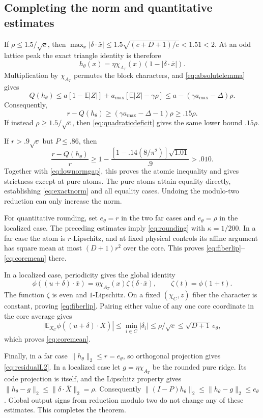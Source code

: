 \documentclass[11pt]{article}
\newcommand{\E}{\mathbb E}
\begin{document}
\subsection{Completing the norm and quantitative estimates}

If $\rho\le1.5/\sqrt c$, then
$\max_x|\delta\cdot\bar x|\le1.5\sqrt{(c+D+1)/c}<1.51<2$.
At an odd lattice peak the exact triangle identity is therefore
\[
 h_\theta(x)=\eta\chi_{A_T}(x)(1-|\delta\cdot\bar x|).
\]
Multiplication by $\chi_{A_T}$ permutes the block characters, and
\eqref{eq:absolutelemma} gives
\[
 Q(h_\theta)\le a[1-\E|Z|]+a_{\max}[\E|Z|-\gamma\rho]
    \le a-(\gamma a_{\max}-\Delta)\rho.
\]
Consequently,
\begin{equation}\label{eq:smallrho}
 r-Q(h_\theta)\ge(\gamma a_{\max}-\Delta-1)\rho\ge.15\rho.
\end{equation}
If instead $\rho\ge1.5/\sqrt c$, then
\eqref{eq:quadraticdeficit} gives the same lower bound $.15\rho$.

If $r>.9\sqrt c$ but $P\le.86$, then
\[
 \frac{r-Q(h_\theta)}r
 \ge1-\frac{[1-.14(8/\pi^2)]\sqrt{1.01}}{.9}>.010.
\]
Together with \eqref{eq:lownormgap}, this proves the atomic inequality
and gives strictness except at pure atoms. The pure atoms attain
equality directly, establishing \eqref{eq:exactnorm} and all equality
cases. Undoing the modulo-two reduction can only increase the norm.

For quantitative rounding, set $e_\theta=r$ in the two far cases
and $e_\theta=\rho$ in the localized case. The preceding estimates
imply \eqref{eq:rounding} with $\kappa=1/200$. In a far case the atom
is $r$-Lipschitz, and at fixed physical controls its affine argument
has square mean at most $(D+1)r^2$ over the core. This proves
\eqref{eq:fiberlip}--\eqref{eq:coremean} there.

In a localized case, periodicity gives the global identity
\[
 \phi((u+\delta)\cdot\bar x)
    =\eta\chi_{A_T}(x)\zeta(\delta\cdot\bar x),
 \qquad \zeta(t)=\phi(1+t).
\]
The function $\zeta$ is even and $1$-Lipschitz. On a fixed
$(\chi_C,z)$ fiber the character is constant, proving
\eqref{eq:fiberlip}. Pairing either value of any one core coordinate
in the core average gives
\[
 |\E_{X_C}\phi((u+\delta)\cdot\bar X)|
       \le\min_{i\in C}|\delta_i|
       \le\rho/\sqrt c\le\sqrt{D+1}\,e_\theta,
\]
which proves \eqref{eq:coremean}.

Finally, in a far case $\|h_\theta\|_2\le r=e_\theta$, so orthogonal
projection gives \eqref{eq:residualL2}. In a localized case let
$g=\eta\chi_{A_T}$ be the rounded pure ridge. Its code projection is
itself, and the Lipschitz property gives
$\|h_\theta-g\|_2\le\|\delta\cdot\bar X\|_2=\rho$.
Consequently
$\|(I-P)h_\theta\|_2\le\|h_\theta-g\|_2\le e_\theta$.
Global output signs from reduction modulo two do not change any of
these estimates. This completes the theorem.
\end{document}

